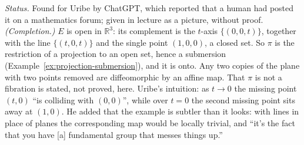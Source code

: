 \documentclass[11pt]{report}
\begin{document}
\textit{Status.} Found for Uribe by ChatGPT, which reported that a human had posted it on a mathematics forum; given in lecture as a picture, without proof. \textit{(Completion.)} $E$ is open in $\mathbb{R}^3$: its complement is the $t$-axis $\{(0,0,t)\}$, together with the line $\{(t, 0, t)\}$ and the single point $(1, 0, 0)$, a closed set. So $\pi$ is the restriction of a projection to an open set, hence a submersion (Example~\ref{ex:projection-submersion}), and it is onto. Any two copies of the plane with two points removed are diffeomorphic by an affine map. That $\pi$ is not a fibration is stated, not proved, here. Uribe's intuition: as $t \to 0$ the missing point $(t, 0)$ ``is colliding with $(0,0)$'', while over $t = 0$ the second missing point sits away at $(1, 0)$. He added that the example is subtler than it looks: with lines in place of planes the corresponding map would be locally trivial, and ``it's the fact that you have [a] fundamental group that messes things up.''
\end{document}
